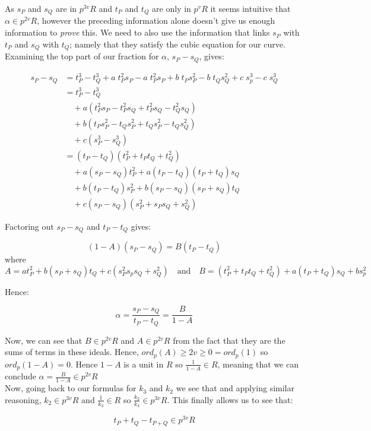 \documentclass{article}
\begin{document}
As $s_P$ and $s_Q$ are in $p^{3v}R$ and $t_P$ and $t_Q$ are only in $p^v R$ it seems intuitive that $\alpha \in p^{2v}R$, however the preceding information alone doesn't give us enough information to \emph{prove} this. We need to also use the information that links $s_P$ with $t_P$ and $s_Q$ with $t_Q$; namely that they satisfy the cubic equation for our curve. Examining the top part of our fraction for $\alpha$, $s_P - s_Q$, gives:

\begin{align*} 
s_P - s_Q &= t_P^3 - t_Q^3 + a \; t_P^2 s_P - a \; t_P^2 s_P + b \; t_P s_P^2 - b \; t_Q s_Q^2 + c \; s_p^3 - c \; s_Q^3 \\
&= t_P^3 - t_Q^3 \\
& \quad + a(t_P^2 s_P - t_P^2 s_Q + t_P^2 s_Q - t_Q^2 s_Q) \\
& \quad + b(t_P s_P^2 - t_Q s_P^2 + t_Q s_P^2 - t_Q s_Q^2) \\
& \quad + c(s_P^3 - s_Q^3) \\
&= (t_P - t_Q)(t_P^2 + t_P t_Q + t_Q^2) \\
& \quad + a(s_P - s_Q)t_P^2 + a(t_P - t_Q)(t_P + t_Q)s_Q \\
& \quad + b(t_P - t_Q)s_P^2 + b(s_P - s_Q)(s_P + s_Q)t_Q \\
& \quad + c(s_P - s_Q)(s_P^2 + s_P s_Q + s_Q ^2)
\end{align*} 


Factoring out $s_P - s_Q$ and $t_P - t_Q$ gives:

\[(1 - A)(s_P - s_Q) = B(t_P - t_Q)\]
where 
\[A = a t_P^2 + b(s_P + s_Q)t_Q + c(s_P ^2 s_p s_Q + s_Q^2) 
\quad \text{and} \quad
B = (t_P^2 + t_P t_Q + t_Q^2) + a (t_P + t_Q)s_Q + b s_p^2\]

Hence: 

\[ \alpha = \frac{s_P - s_Q}{t_P - t_Q} = \frac{B}{1 - A} \]

Now, we can see that $B \in p^{2v}R$ and $A \in p^{2v} R$ from the fact that they are the sums of terms in these ideals. Hence, $ord_p(A) \geq 2v \geq 0 = ord_p(1)$ so $ord_p(1 - A) = 0$. Hence $1 - A$ is a unit in $R$ so $\frac{1}{1 - A} \in R$, meaning that we can conclude $\alpha = \frac{B}{1 - A} \in p^{2v}R$ \\

Now, going back to our formulas for $k_3$ and $k_2$ we see that and applying similar reasoning, $k_2 \in p^{3v}R$ and $\frac{1}{k_3} \in R$ so $\frac{k_2}{k_3} \in p^{3v}R$. This finally allows us to see that:

\[ t_P + t_Q - t_{P+Q} \in p^{3v}R \]
\end{document}
